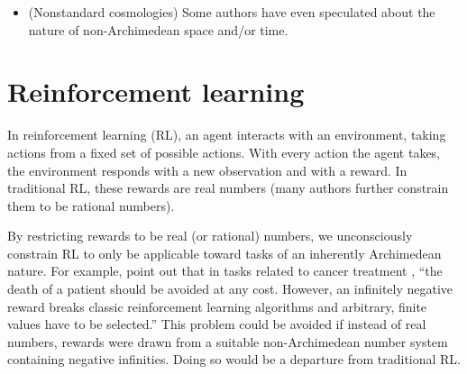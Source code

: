 \documentclass[twoside,11pt]{article}
\begin{document}
\begin{example}
\begin{itemize}
        \citep{alexander2019measuring}, where we propose measuring the
        intelligence of mechanical
        knowing agents using computable ordinals, the same non-Archimedean number system
        which proof theorists use to measure logical strength of mathematical
        theories. Incidentally, if AGI intelligence is non-Archimedean, then
        Proposition \ref{maindilemma} shows it is
        impossible to measure machine intelligence using real numbers without some
        of those measurements being misleading\footnote{This would solve an open problem
        implicitly stated by \citet{legg} when they said of their
        real-number universal intelligence measure: ``...none of these people have
        been able to communicate why the work [on measuring universal intelligence
        using real numbers] is so obviously flawed in any concrete way ...
        If anyone would like to properly explain their position to us in the future,
        we promise not to chase you down the street!''}.
        \item
        (Nonstandard cosmologies)
        Some
        authors
        \citep{al2016surreal, andreka2012logic, reeder2012infinitesimals,
        rosinger2007cosmic, chen2019infinitesimal} have
        even speculated about the nature of non-Archimedean space and/or
        time.
    \end{itemize}
\end{example}


\section{Reinforcement learning}
\label{reinforcementlearningsection}

In reinforcement learning (RL), an agent interacts with an environment,
taking actions from a fixed set of possible actions. With every action the
agent takes, the environment responds with a new observation and with a
reward. In traditional RL, these rewards are real numbers (many
authors further constrain them to be rational numbers).

By restricting rewards to be real (or rational) numbers, we unconsciously
constrain RL to only be applicable toward tasks of an inherently Archimedean
nature. For example, \citet{wirth2017survey} point out that
in tasks related to cancer treatment \citep{zhao2009reinforcement},
``the death of a patient should be avoided at any cost. However, an
infinitely negative reward breaks classic reinforcement learning algorithms
and arbitrary, finite values have to be selected.'' This problem could be
avoided if instead of real numbers, rewards were drawn from a suitable
non-Archimedean number system containing negative infinities. Doing so would
be a departure from traditional RL.
\end{document}
